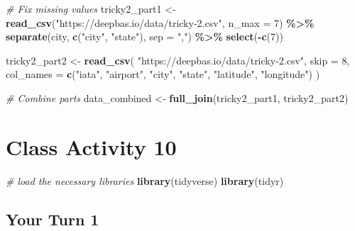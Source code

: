 \documentclass[
]{book}
\newenvironment{Shaded}{\begin{snugshade}}{\end{snugshade}}
\newcommand{\AttributeTok}[1]{\textcolor[rgb]{0.13,0.29,0.53}{#1}}
\newcommand{\CommentTok}[1]{\textcolor[rgb]{0.56,0.35,0.01}{\textit{#1}}}
\newcommand{\DecValTok}[1]{\textcolor[rgb]{0.00,0.00,0.81}{#1}}
\newcommand{\FunctionTok}[1]{\textcolor[rgb]{0.13,0.29,0.53}{\textbf{#1}}}
\newcommand{\NormalTok}[1]{#1}
\newcommand{\OtherTok}[1]{\textcolor[rgb]{0.56,0.35,0.01}{#1}}
\newcommand{\SpecialCharTok}[1]{\textcolor[rgb]{0.81,0.36,0.00}{\textbf{#1}}}
\newcommand{\StringTok}[1]{\textcolor[rgb]{0.31,0.60,0.02}{#1}}
\begin{document}
\begin{Shaded}
\begin{Highlighting}[]
\CommentTok{\# Fix missing values}
\NormalTok{tricky2\_part1 }\OtherTok{\textless{}{-}} \FunctionTok{read\_csv}\NormalTok{(}\StringTok{"https://deepbas.io/data/tricky{-}2.csv"}\NormalTok{, }\AttributeTok{n\_max =} \DecValTok{7}\NormalTok{) }\SpecialCharTok{\%\textgreater{}\%}
  \FunctionTok{separate}\NormalTok{(city, }\FunctionTok{c}\NormalTok{(}\StringTok{"city"}\NormalTok{, }\StringTok{"state"}\NormalTok{), }\AttributeTok{sep =} \StringTok{","}\NormalTok{) }\SpecialCharTok{\%\textgreater{}\%}
  \FunctionTok{select}\NormalTok{(}\SpecialCharTok{{-}}\FunctionTok{c}\NormalTok{(}\DecValTok{7}\NormalTok{))}

\NormalTok{tricky2\_part2 }\OtherTok{\textless{}{-}} \FunctionTok{read\_csv}\NormalTok{(}
  \StringTok{"https://deepbas.io/data/tricky{-}2.csv"}\NormalTok{,}
  \AttributeTok{skip =} \DecValTok{8}\NormalTok{, }
  \AttributeTok{col\_names =} \FunctionTok{c}\NormalTok{(}\StringTok{"iata"}\NormalTok{, }\StringTok{"airport"}\NormalTok{, }\StringTok{"city"}\NormalTok{, }\StringTok{"state"}\NormalTok{,  }\StringTok{"latitude"}\NormalTok{, }\StringTok{"longitude"}\NormalTok{)}
\NormalTok{)}

\CommentTok{\# Combine parts}
\NormalTok{data\_combined }\OtherTok{\textless{}{-}} \FunctionTok{full\_join}\NormalTok{(tricky2\_part1, tricky2\_part2)}
\end{Highlighting}
\end{Shaded}

\hypertarget{class-activity-10}{%
\chapter{Class Activity 10}\label{class-activity-10}}

\begin{Shaded}
\begin{Highlighting}[]
\CommentTok{\# load the necessary libraries}
\FunctionTok{library}\NormalTok{(tidyverse)}
\FunctionTok{library}\NormalTok{(tidyr)}
\end{Highlighting}
\end{Shaded}

\hypertarget{your-turn-1-3}{%
\section{Your Turn 1}\label{your-turn-1-3}}
\end{document}
